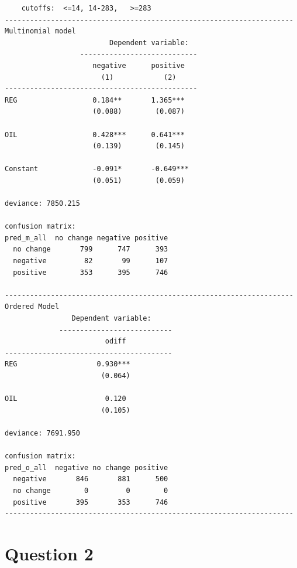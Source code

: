 \documentclass[12pt,letterpaper]{article}
\begin{document}
  \begin{lstlisting}
    cutoffs:  <=14, 14-283,   >=283
---------------------------------------------------------------------
Multinomial model    
                         Dependent variable:     
                  ----------------------------
                     negative      positive   
                       (1)            (2)     
----------------------------------------------
REG                  0.184**       1.365***   
                     (0.088)        (0.087)   
                                              
OIL                  0.428***      0.641***   
                     (0.139)        (0.145)   
                                              
Constant             -0.091*       -0.649***  
                     (0.051)        (0.059)  
  
deviance: 7850.215

confusion matrix:
pred_m_all  no change negative positive
  no change       799      747      393
  negative         82       99      107
  positive        353      395      746

---------------------------------------------------------------------
Ordered Model
                Dependent variable:    
             ---------------------------
                        odiff           
----------------------------------------
REG                   0.930***          
                       (0.064)          
                                        
OIL                     0.120           
                       (0.105)          

deviance: 7691.950

confusion matrix:
pred_o_all  negative no change positive
  negative       846       881      500
  no change        0         0        0
  positive       395       353      746                   
---------------------------------------------------------------------
\end{lstlisting}
  

\clearpage


\section*{Question 2} 
\vspace{.25cm}
\end{document}
